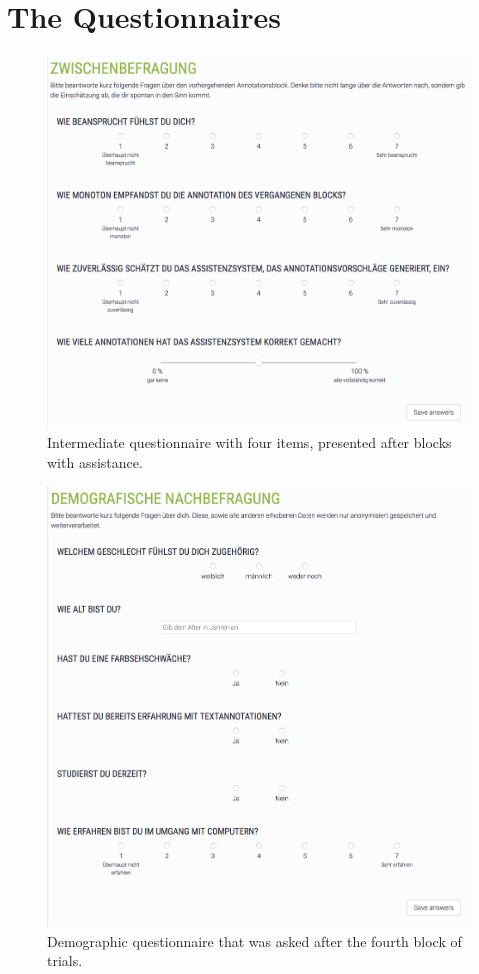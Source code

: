 \section{The Questionnaires}
  \label{sec:appendixQuestionnaires}
  \begin{figure}[H]
		\centering
		\includegraphics[width=15cm]{assets/appendix/questionnaire_4.png}
		\caption{Intermediate questionnaire with four items, presented after blocks with assistance.}%
		\label{fig:questionnaireIntermediate4}%
	\end{figure}

  \begin{figure}[H]
		\centering
		\includegraphics[width=15cm]{assets/appendix/questionnaire_demog.png}
		\caption{Demographic questionnaire that was asked after the fourth block of trials.}%
		\label{fig:questionnaireDemog}%
	\end{figure}

